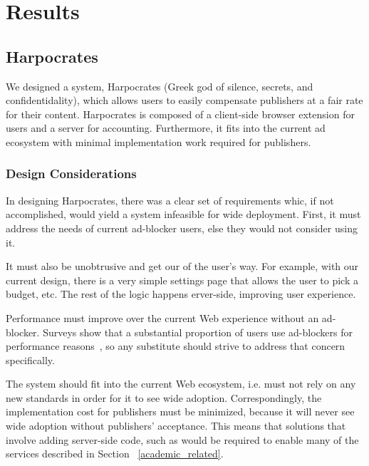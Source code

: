 \section{Results}
\subsection{Harpocrates}
We designed a system, Harpocrates (Greek god of silence, secrets, and confidentidality), which allows users to easily compensate publishers at a fair rate for their content.
Harpocrates is composed of a client-side browser extension for users and a server for accounting.
Furthermore, it fits into the current ad ecosystem with minimal implementation work required for publishers.

\subsubsection{Design Considerations}
In designing Harpocrates, there was a clear set of requirements whic, if not accomplished, would yield a system infeasible for wide deployment.
First, it must address the needs of current ad-blocker users, else they would not consider using it.

It must also be unobtrusive and get our of the user's way.
For example, with our current design, there is a very simple settings page that allows the user to pick a budget, etc.
The rest of the logic happens erver-side, improving user experience.

Performance must improve over the current Web experience without an ad-blocker.
Surveys show that a substantial proportion of users use ad-blockers for performance reasons~\cite{hubspot2016adblock}, so any substitute should strive to address that concern specifically.

The system should fit into the current Web ecosystem, i.e. must not rely on any new standards in order for it to see wide adoption.
Correspondingly, the implementation cost for publishers must be minimized, because it will never see wide adoption without publishers' acceptance.
This means that solutions that involve adding server-side code, such as would be required to enable many of the services described in Section ~\ref{academic_related}.

